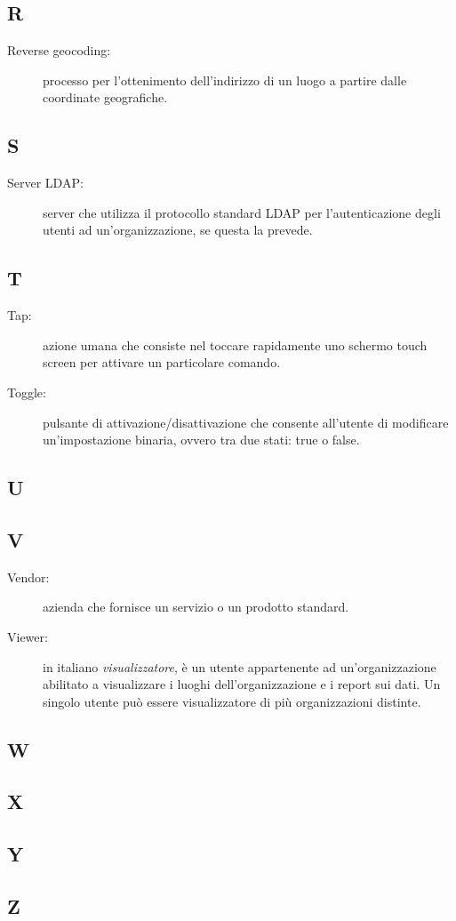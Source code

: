 \documentclass[../manuale-utente.tex]{subfiles}
\begin{document}
\subsection{R}
\begin{description}
    \item[Reverse geocoding:] processo per l'ottenimento dell'indirizzo di un luogo a partire dalle coordinate geografiche.
\end{description}

\subsection{S}
\begin{description}
    \item[Server LDAP:] server che utilizza il protocollo standard LDAP per l'autenticazione degli utenti ad un'organizzazione, se questa la prevede.
\end{description}

\subsection{T}
\begin{description}
  \item[Tap:] azione umana che consiste nel toccare rapidamente uno schermo touch screen per attivare un particolare comando.
  \item[Toggle:] pulsante di attivazione/disattivazione che consente all'utente di modificare un'impostazione binaria, ovvero tra due stati: true o false.
\end{description}

\subsection{U}

\subsection{V}
\begin{description}
    \item[Vendor:] azienda che fornisce un servizio o un prodotto standard.
    \item[Viewer:] in italiano \textit{visualizzatore}, è un utente appartenente ad un'organizzazione abilitato a visualizzare i luoghi dell'organizzazione e i report sui dati. Un singolo utente può essere visualizzatore di più organizzazioni distinte.
\end{description}

\subsection{W}

\subsection{X}

\subsection{Y}

\subsection{Z}
\end{document}
